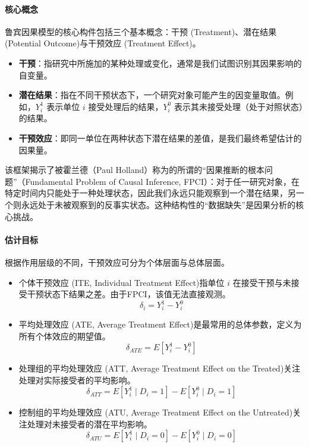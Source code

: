 \paragraph*{核心概念}

鲁宾因果模型的核心构件包括三个基本概念：干预 (Treatment)、潜在结果 (Potential Outcome)与干预效应 (Treatment Effect)。

\begin{itemize}
    \item \textbf{干预}：指研究中所施加的某种处理或变化，通常是我们试图识别其因果影响的自变量。
    \item \textbf{潜在结果}：指在不同干预状态下，一个研究对象可能产生的因变量取值。例如，$Y_i^1$ 表示单位 $i$ 接受处理后的结果，$Y_i^0$ 表示其未接受处理（处于对照状态）的结果。
    \item \textbf{干预效应}：即同一单位在两种状态下潜在结果的差值，是我们最终希望估计的因果量。
\end{itemize}

该框架揭示了被霍兰德（Paul Holland）称为的所谓的“因果推断的根本问题”（Fundamental Problem of Causal Inference, FPCI）：对于任一研究对象，在特定时间内只能处于一种处理状态，因此我们永远只能观察到一个潜在结果，另一个则永远处于未被观察到的反事实状态。这种结构性的“数据缺失”是因果分析的核心挑战。

\paragraph*{估计目标}

根据作用层级的不同，干预效应可分为个体层面与总体层面。

\begin{itemize}
    \item 个体干预效应 (ITE, Individual Treatment Effect)指单位 $i$ 在接受干预与未接受干预状态下结果之差。由于FPCI，该值无法直接观测。
    \begin{equation}
        \delta_i = Y_i^{1} - Y_i^{0}
    \end{equation}
    \item 平均处理效应 (ATE, Average Treatment Effect)是最常用的总体参数，定义为所有个体效应的期望值。
    \begin{equation}
        \delta_{ATE} = E[Y_i^1 - Y_i^0]
    \end{equation}
    \item 处理组的平均处理效应 (ATT, Average Treatment Effect on the Treated)关注处理对实际接受者的平均影响。
    \begin{equation}
        \delta_{ATT} = E[Y_i^1 \mid D_i = 1] - E[Y_i^0 \mid D_i = 1]
    \end{equation}
    \item 控制组的平均处理效应 (ATU, Average Treatment Effect on the Untreated)关注处理对未接受者的潜在平均影响。
    \begin{equation}
        \delta_{ATU} = E[Y_i^1 \mid D_i = 0] - E[Y_i^0 \mid D_i = 0]
    \end{equation}
\end{itemize}

